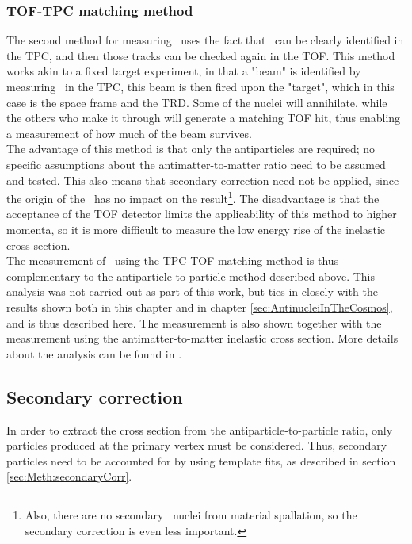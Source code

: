 \subsubsection{TOF-TPC matching method}\label{sec:TOFTPCMethod}
The second method for measuring \sigmainel\ uses the fact that \ahe\ can be clearly identified in the TPC, and then those tracks can be checked again in the TOF. This method works akin to a fixed target experiment, in that a "beam" is identified by measuring \ahe\ in the TPC, this beam is then fired upon the "target", which in this case is the space frame and the TRD. Some of the nuclei will annihilate, while the others who make it through will generate a matching TOF hit, thus enabling a measurement of how much of the beam survives. \\
The advantage of this method is that only the antiparticles are required; no specific assumptions about the antimatter-to-matter ratio need to be assumed and tested. This also means that secondary correction need not be applied, since the origin of the \ahe\ has no impact on the result\footnote{Also, there are no secondary \ahe\ nuclei from material spallation, so the secondary correction is even less important.}. The disadvantage is that the acceptance of the TOF detector limits the applicability of this method to higher momenta, so it is more difficult to measure the low energy rise of the inelastic cross section. \\

The measurement of \sigmainel\ using the TPC-TOF matching method is thus complementary to the antiparticle-to-particle method described above. This analysis was not carried out as part of this work, but ties in closely with the results shown both in this chapter and in chapter \ref{sec:AntinucleiInTheCosmos}, and is thus described here. The measurement is also shown together with the measurement using the antimatter-to-matter inelastic cross section. More details about the analysis can be found in \cite{PavelAN, antiHe3XS}.

\subsection{Secondary correction}
In order to extract the cross section from the antiparticle-to-particle ratio, only particles produced at the primary vertex must be considered. Thus, secondary particles need to be accounted for by using template fits, as described in section \ref{sec:Meth:secondaryCorr}. \\

